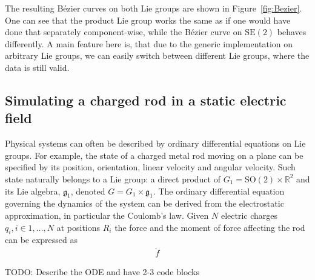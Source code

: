 \documentclass{juliacon}
\begin{document}
The resulting Bézier curves on both Lie groups are shown in Figure~\ref{fig:Bezier}.
One can see that the product Lie group works the same as if one would have done that
separately component-wise, while the Bézier curve on \(\mathrm{SE}(2)\) behaves differently.
A main feature here is, that due to the generic implementation on arbitrary Lie groups,
we can easily switch between different Lie groups, where the data is still valid.

\subsection{Simulating a charged rod in a static electric field}

Physical systems can often be described by ordinary differential equations on Lie groups.
For example, the state of a charged metal rod moving on a plane can be specified by its position, orientation, linear velocity and angular velocity.
Such state naturally belongs to a Lie group: a direct product of \(G_1 = \mathrm{SO}(2) \times \mathbb{R}^2\) and its Lie algebra, \(\mathfrak{g}_1\), denoted \(G = G_1 \times \mathfrak{g}_1\).
The ordinary differential equation governing the dynamics of the system can be derived from the electrostatic approximation, in particular the Coulomb's law.
Given \(N\) electric charges \(q_i, i \in {1, \dots, N}\) at positions \(R_i\) the force and the moment of force affecting the rod can be expressed as
\begin{align}
    \ddot{f}
\end{align}

{\color{red}TODO: Describe the ODE and have 2-3 code blocks}
\end{document}
